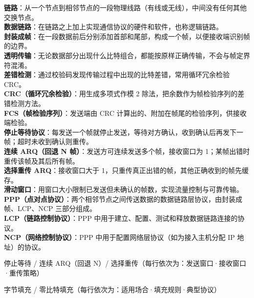 \documentclass[a4paper,11pt]{article}
\begin{document}
\begin{keyterms}
\textbf{链路}：从一个节点到相邻节点的一段物理线路（有线或无线），中间没有任何其他交换节点。\\
\textbf{数据链路}：在链路之上加上实现通信协议的硬件和软件，也称逻辑链路。\\
\textbf{封装成帧}：在一段数据前后分别添加首部和尾部，构成一个帧，以便接收端识别帧的边界。\\
\textbf{透明传输}：无论数据部分出现什么比特组合，都能按原样正确传输，不会与帧定界符混淆。\\
\textbf{差错检测}：通过校验码发现传输过程中出现的比特差错，常用循环冗余检验 CRC。\\
\textbf{CRC（循环冗余检验）}：用生成多项式作模 2 除法，把余数作为帧检验序列的差错检测方法。\\
\textbf{FCS（帧检验序列）}：发送端由 CRC 计算出的、附加在帧尾的检验序列，供接收端检验。\\
\textbf{停止等待协议}：每发送一个帧就停止发送，等待对方确认，收到确认后再发下一帧；超时未收到确认则重传。\\
\textbf{连续 ARQ（回退 N 帧）}：发送方可连续发送多个帧，接收窗口为 1；某帧出错时重传该帧及其后所有帧。\\
\textbf{选择重传 ARQ}：接收窗口大于 1，只重传真正出错的帧，其他正确收到的帧先缓存。\\
\textbf{滑动窗口}：用窗口大小限制已发送但未确认的帧数，实现流量控制与可靠传输。\\
\textbf{PPP（点对点协议）}：两个相邻节点之间传送数据的数据链路层协议，由封装成帧、LCP、NCP 三部分组成。\\
\textbf{LCP（链路控制协议）}：PPP 中用于建立、配置、测试和释放数据链路连接的协议。\\
\textbf{NCP（网络控制协议）}：PPP 中用于配置网络层协议（如为接入主机分配 IP 地址）的协议。
\end{keyterms}

\begin{contrast}{停止等待 / 连续 ARQ（回退 N）/ 选择重传（每行依次为：发送窗口·接收窗口·重传策略）}
\end{contrast}

\begin{contrast}{字节填充 / 零比特填充（每行依次为：适用场合·填充规则·典型协议）}
\end{contrast}
\end{document}
